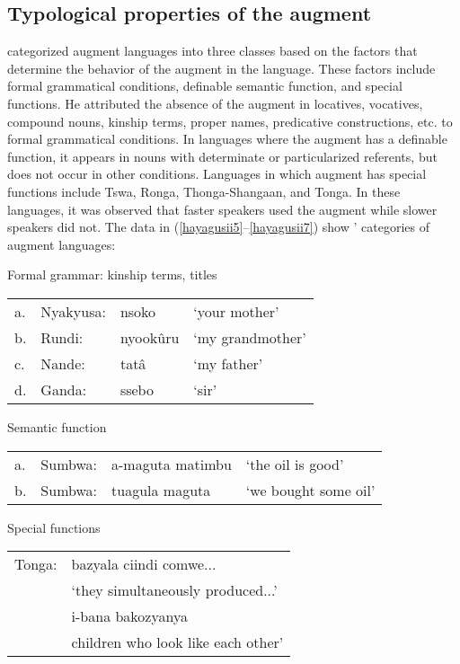 \documentclass[output=paper]{langscibook}
\begin{document}
\subsection{Typological properties of the augment}
 categorized augment languages into three classes based on the factors that determine the behavior of the augment in the language. These factors include formal grammatical conditions, definable semantic function, and special functions. He attributed the absence of the augment in locatives, vocatives, compound nouns, kinship terms, proper names, predicative constructions, etc. to formal grammatical conditions. In languages where the augment has a definable function, it appears in nouns with determinate or particularized referents, but does not occur in other conditions. Languages in which augment has special functions include Tswa, Ronga, Thonga-Shangaan, and Tonga. In these languages, it was observed that faster speakers used the augment while slower speakers did not. The data in (\ref{hayagusii5}--\ref{hayagusii7}) show \citeauthor{blois1970augment}’ categories of augment languages:

\begin{exe}
\ex Formal grammar: kinship terms, titles \\
\label{hayagusii5}
\begin{tabular}{llll}
 a. &	Nyakyusa: &	nsoko 	&	‘your mother’ \\
b. &	Rundi:	&	nyookûru &	‘my grandmother’\\
c.	& Nande: &		tatâ	&	‘my father’\\
d. &	Ganda:	&	ssebo	&	‘sir’\\
\end{tabular}

\ex Semantic function \\
\label{hayagusii6}
\begin{tabular}{llll}
 a. &	Sumbwa: &	a-maguta matimbu &	‘the oil is good’ \\
b. &	Sumbwa: &	tuagula maguta &	‘we bought some oil’\\
\end{tabular}

\ex Special functions \\
\label{hayagusii7}
\begin{tabular}{ll}
   Tonga:  & bazyala ciindi comwe...  \\
     & ‘they simultaneously produced...' \\
     & i-bana bakozyanya \\
     & children who look like each other’\\
\end{tabular}
\end{exe}
\end{document}
